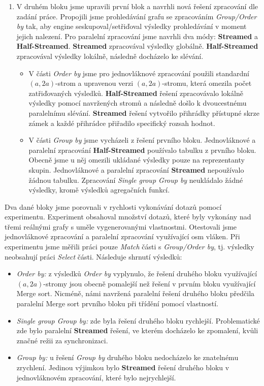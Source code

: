 \begin{enumerate}
\item
V druhém bloku jsme upravili první blok a navrhli nová řešení zpracování dle zadání práce.
Propojili jsme prohledávání grafu se zpracováním \textit{Group/Order by} tak, aby engine seskupoval/setřiďoval výsledky prohledávání v moment jejich nalezení.
Pro paralelní zpracování jsme navrhli dva módy: \textbf{Streamed} a \textbf{Half-Streamed}.
\textbf{Streamed} zpracovával výsledky globálně.
\textbf{Half-Streamed} zpracovával výsledky lokálně, následně docházelo ke slévání.
\begin{itemize}
\item V části \textit{Order by} jsme pro jednovláknové zpracování použili standardní $(a, 2a)$-strom a upravenou verzi $(a, 2a)$-stromu, která omezila počet zatřiďovaných výsledků.  
\textbf{Half-Streamed} řešení zpracovávalo lokálně výsledky pomocí navržených stromů a následně došlo k dvoucestnému paralelnímu slévání.
\textbf{Streamed} řešení vytvořilo přihrádky přístupné skrze zámek a každé přihrádce přiřadilo specifický rozsah hodnot.
\item
V části \textit{Group by} jsme vycházeli z řešení prvního bloku.
Jednovláknové a paralelní zpracování \textbf{Half-Streamed} používalo tabulku z prvního bloku.
Obecně jsme u něj omezili ukládané výsledky pouze na reprezentanty skupin.
Jednovláknové a paralelní zpracování \textbf{Streamed} nepoužívalo žádnou tabulku.
Zpracování \textit{Single group Group by} neukládalo žádné výsledky, kromě výsledků agregačních funkcí.
\end{itemize}
\end{enumerate}

Dva dané bloky jsme porovnali v rychlosti vykonávání dotazů pomocí experimentu.
Experiment obsahoval množství dotazů, které byly vykonány nad třemi reálnými grafy s uměle vygenerovanými vlastnostmi.
Otestovali jsme jednovláknové zpracování a paralelní zpracování využívající osm vláken.
Při experimentu jsme měřili práci pouze \textit{Match} části s \textit{Group/Order by}, tj. výsledky neobsahují práci \textit{Select} části.
Následuje shrnutí výsledků:
\begin{itemize}

\item \textit{Order by:} z výsledků \textit{Order by} vyplynulo, že řešení druhého bloku využívající $(a, 2a)$-stromy jsou obecně pomalejší než řešení v prvním bloku využívající Merge sort.
Nicméně, námi navržená paralelní řešení druhého bloku předčila paralelní Merge sort prvního bloku při třídění pomocí vlastností.

\item \textit{Single group Group by:} zde byla řešení druhého bloku rychlejší.
Problematické zde bylo paralelní \textbf{Streamed} řešení, ve kterém docházelo ke zpomalení, kvůli značné režii za synchronizaci.

\item \textit{Group by:} u řešení \textit{Group by} druhého bloku nedocházelo ke znatelnému zrychlení.
Jedinou výjimkou bylo \textbf{Streamed} řešení druhého bloku v jednovláknovém zpracování, které bylo nejrychlejší.

\end{itemize}

